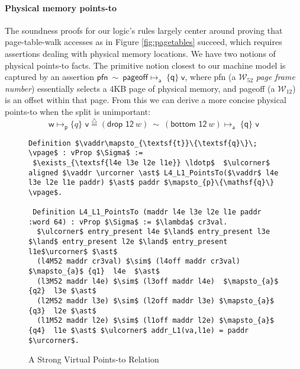 \paragraph{Physical memory  points-to} The soundness proofs for our logic's rules largely center around 
proving that page-table-walk accesses as in Figure \ref{fig:pagetables} succeed, which requires assertions
dealing with physical memory locations.
We have two notions of physical points-to facts. The primitive notion closest to our machine model is captured by an assertion
$ \textsf{pfn} \ \sim \ \textsf{pageoff} \mapsto_{\textsf{a}} \; \{\textsf{q}\} \; \textsf{v} $, where \textsf{pfn} (a $\mathcal{W}_{52}$ \emph{page frame number}) essentially selects a 4KB page of physical memory,
and \textsf{pageoff} (a $\mathcal{W}_{12}$) is an offset within that page.
From this we can derive a more concise physical points-to when the split is unimportant:
\[\textsf{w} \mapsto_{\textsf{p}} \{q\} \textsf{ v} \stackrel{\triangle}{=} (\textsf{drop 12}~w) \ \sim \ (\textsf{bottom 12}~w)\mapsto_{\textsf{a}} \; \{\textsf{q}\} \textsf{ v} \]
\begin{figure*}
  \begin{lstlisting}[language=Coq]
 Definition $\vaddr\mapsto_{\textsf{t}}\{\textsf{q}\}\; \vpage$ : vProp $\Sigma$ := 
 $\exists_{\textsf{l4e l3e l2e l1e}} \ldotp$  $\ulcorner$ aligned $\vaddr \urcorner \ast$ L4_L1_PointsTo($\vaddr$ l4e l3e l2e l1e paddr) $\ast$ paddr $\mapsto_{p}\{\mathsf{q}\} \vpage$.

 Definition L4_L1_PointsTo (maddr l4e l3e l2e l1e paddr :word 64) : vProp $\Sigma$ := $\lambda$ cr3val.
  $\ulcorner$ entry_present l4e $\land$ entry_present l3e $\land$ entry_present l2e $\land$ entry_present l1e$\urcorner$ $\ast$
  (l4M52 maddr cr3val) $\sim$ (l4off maddr cr3val) $\mapsto_{a}$ {q1}  l4e  $\ast$
  (l3M52 maddr l4e) $\sim$ (l3off maddr l4e)  $\mapsto_{a}$ {q2}  l3e $\ast$ 
  (l2M52 maddr l3e) $\sim$ (l2off maddr l3e) $\mapsto_{a}$ {q3}  l2e $\ast$
  (l1M52 maddr l2e) $\sim$ (l1off maddr l2e) $\mapsto_{a}$ {q4}  l1e $\ast$ $\ulcorner$ addr_L1(va,l1e) = paddr $\urcorner$.
\end{lstlisting}
\vspace{-1em}
\caption{A Strong Virtual Points-to Relation}
  \label{fig:strongvirtualpointsto}
\end{figure*}



